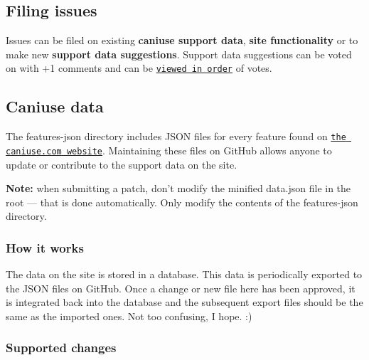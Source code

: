 \subsection*{Filing issues}

Issues can be filed on existing {\bfseries caniuse support data}, {\bfseries site functionality} or to make new {\bfseries support data suggestions}. Support data suggestions can be voted on with {\ttfamily +1} comments and can be \href{http://caniuse.com/issue-list}{\tt viewed in order} of votes.

\subsection*{Caniuse data}

The {\ttfamily features-\/json} directory includes J\+S\+ON files for every feature found on \href{http://caniuse.com/}{\tt the caniuse.\+com website}. Maintaining these files on Git\+Hub allows anyone to update or contribute to the support data on the site.

{\bfseries Note\+:} when submitting a patch, don’t modify the minified {\ttfamily data.\+json} file in the root — that is done automatically. Only modify the contents of the {\ttfamily features-\/json} directory.

\subsubsection*{How it works}

The data on the site is stored in a database. This data is periodically exported to the J\+S\+ON files on Git\+Hub. Once a change or new file here has been approved, it is integrated back into the database and the subsequent export files should be the same as the imported ones. Not too confusing, I hope. \+:)

\subsubsection*{Supported changes}

